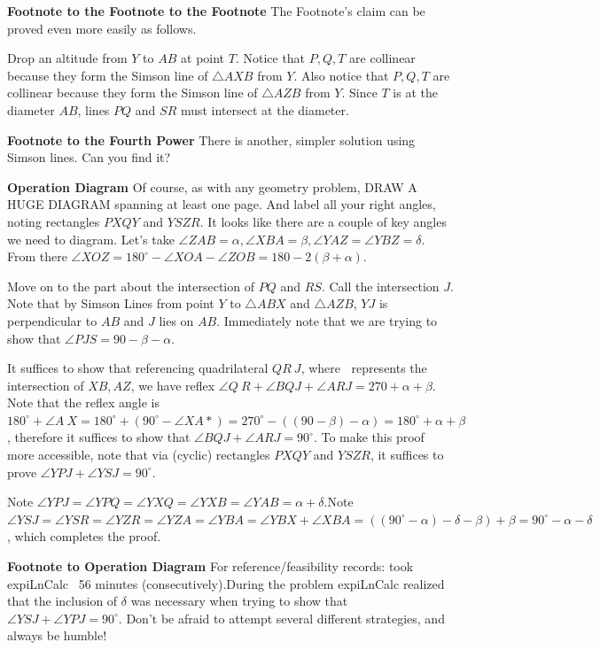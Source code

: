 \begin{enumerate}
 \textbf{Footnote to the Footnote to the Footnote} The Footnote's claim can be proved even more easily as follows.

 Drop an altitude from $Y$ to $AB$ at point $T$.  Notice that $P, Q, T$ are collinear because they form the Simson line of $\triangle AXB$ from $Y$.  Also notice that $P, Q, T$ are collinear because they form the Simson line of $\triangle AZB$ from $Y$.  Since $T$ is at the diameter $AB$, lines $PQ$ and $SR$ must intersect at the diameter.

 \textbf{Footnote to the Fourth Power} There is another, simpler solution using Simson lines. Can you find it?

 \textbf{Operation Diagram} Of course, as with any geometry problem, DRAW A HUGE DIAGRAM spanning at least one page. And label all your right angles, noting rectangles $PXQY$ and $YSZR$. It looks like there are a couple of key angles we need to diagram. Let's take $\angle{ZAB} = \alpha, \angle{XBA} = \beta, \angle{YAZ} = \angle{YBZ} = \delta$. From there $\angle{XOZ}=180^\circ - \angle{XOA}-\angle{ZOB}=180-2(\beta + \alpha)$.

 Move on to the part about the intersection of $PQ$ and $RS$. Call the intersection $J$. Note that by Simson Lines from point $Y$ to $\triangle{ABX}$ and $\triangle{AZB}$, $YJ$ is perpendicular to $AB$ and $J$ lies on $AB$. Immediately note that we are trying to show that $\angle{PJS} = 90 - \beta - \alpha$. 

 It suffices to show that referencing quadrilateral $QR~J$, where $~$ represents the intersection of $XB, AZ$, we have reflex $\angle{Q~R} + \angle{BQJ} + \angle{ARJ} = 270 + \alpha + \beta$. Note that the reflex angle is $180^\circ + \angle{A~X} = 180^\circ + (90^\circ - \angle{XA*}) = 270^\circ - ((90 - \beta) - \alpha) = 180 ^\circ + \alpha + \beta$, therefore it suffices to show that $\angle{BQJ} + \angle{ARJ} = 90^\circ$. To make this proof more accessible, note that via (cyclic) rectangles $PXQY$ and $YSZR$, it suffices to prove $\angle{YPJ} + \angle{YSJ} = 90^\circ$.

 Note $\angle{YPJ} = \angle{YPQ} = \angle{YXQ} = \angle{YXB} = \angle{YAB} = \alpha + \delta$.Note $\angle{YSJ} = \angle{YSR} = \angle{YZR} = \angle{YZA} = \angle{YBA} = \angle{YBX} + \angle{XBA} = ((90^\circ - \alpha) - \delta - \beta) + \beta = 90^\circ - \alpha - \delta$, which completes the proof.

 \textbf{Footnote to Operation Diagram} For reference/feasibility records: took expiLnCalc ~56 minutes (consecutively).During the problem expiLnCalc realized that the inclusion of $\delta$ was necessary when trying to show that $\angle{YSJ}+\angle{YPJ}=90^\circ$. Don't be afraid to attempt several different strategies, and always be humble!


\end{enumerate}
